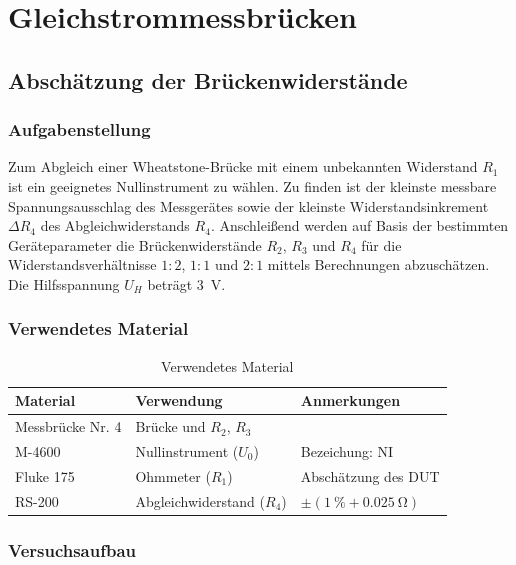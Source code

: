 \newpage
\section{Gleichstrommessbrücken}\label{sec:1}

\subsection{Abschätzung der Brückenwiderstände}\label{sec:1-1}
\subsubsection{Aufgabenstellung}

Zum Abgleich einer Wheatstone-Brücke mit einem unbekannten Widerstand $R_1$ ist
ein geeignetes Nullinstrument zu wählen. Zu finden ist der kleinste messbare
Spannungsausschlag des Messgerätes sowie der kleinste Widerstandsinkrement
$\Delta R_4$ des Abgleichwiderstands $R_4$.	Anschleißend werden auf Basis der
bestimmten Geräteparameter die Brückenwiderstände $R_2$, $R_3$ und $R_4$ für
die Widerstandsverhältnisse $1:2$, $1:1$ und $2:1$ mittels Berechnungen
abzuschätzen. Die Hilfsspannung $U_H$ beträgt \SI{3}{\volt}.

\subsubsection{Verwendetes Material}

\begin{table}[h]
	\centering
	\caption{Verwendetes Material}
	\begin{tabularx}{\textwidth}{XXX}
		\textbf{Material} & \textbf{Verwendung}        & \textbf{Anmerkungen}                        \\ \midrule
		Messbrücke Nr. 4  & Brücke und $R_2$, $R_3$    &                                             \\
		M-4600            & Nullinstrument ($U_0$)     & Bezeichung: NI                              \\
		Fluke 175         & Ohmmeter ($R_1$)           & Abschätzung des DUT                         \\
		RS-200            & Abgleichwiderstand ($R_4$) & $\pm (\SI{1}{\percent} + \SI{0.025}{\ohm})$ \\
	\end{tabularx}
\end{table}
\subsubsection{Versuchsaufbau}

